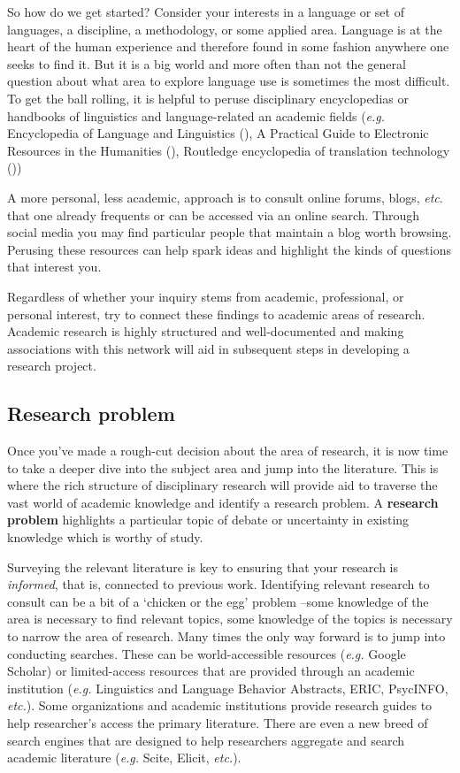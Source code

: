 \documentclass[
  letterpaper,
  DIV=11,
  numbers=noendperiod]{scrreprt}
\theoremstyle{definition}
\theoremstyle{remark}
\begin{document}
So how do we get started? Consider your interests in a language or set
of languages, a discipline, a methodology, or some applied area.
Language is at the heart of the human experience and therefore found in
some fashion anywhere one seeks to find it. But it is a big world and
more often than not the general question about what area to explore
language use is sometimes the most difficult. To get the ball rolling,
it is helpful to peruse disciplinary encyclopedias or handbooks of
linguistics and language-related an academic fields (\emph{e.g.}
Encyclopedia of Language and Linguistics (), A Practical Guide to Electronic Resources in the Humanities
(), Routledge
encyclopedia of translation technology ())

A more personal, less academic, approach is to consult online forums,
blogs, \emph{etc}. that one already frequents or can be accessed via an
online search. Through social media you may find particular people that
maintain a blog worth browsing. Perusing these resources can help spark
ideas and highlight the kinds of questions that interest you.

Regardless of whether your inquiry stems from academic, professional, or
personal interest, try to connect these findings to academic areas of
research. Academic research is highly structured and well-documented and
making associations with this network will aid in subsequent steps in
developing a research project.

\subsection{Research problem}\label{sec-fr-problem}

Once you've made a rough-cut decision about the area of research, it is
now time to take a deeper dive into the subject area and jump into the
literature. This is where the rich structure of disciplinary research
will provide aid to traverse the vast world of academic knowledge and
identify a research problem. A \textbf{research problem} highlights a
particular topic of debate or uncertainty in existing knowledge which is
worthy of study.

Surveying the relevant literature is key to ensuring that your research
is \emph{informed}, that is, connected to previous work. Identifying
relevant research to consult can be a bit of a `chicken or the egg'
problem --some knowledge of the area is necessary to find relevant
topics, some knowledge of the topics is necessary to narrow the area of
research. Many times the only way forward is to jump into conducting
searches. These can be world-accessible resources (\emph{e.g.} Google
Scholar) or limited-access resources that are provided through an
academic institution (\emph{e.g.} Linguistics and Language Behavior
Abstracts, ERIC, PsycINFO, \emph{etc.}). Some organizations and academic
institutions provide research guides to help researcher's access the
primary literature. There are even a new breed of search engines that
are designed to help researchers aggregate and search academic
literature (\emph{e.g.} Scite, Elicit, \emph{etc.}).
\end{document}
